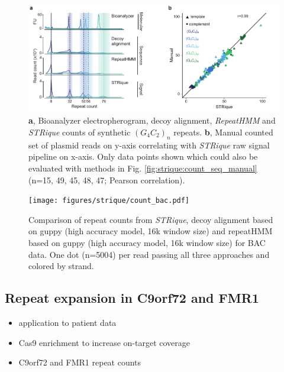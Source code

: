 \begin{figure}[h]
	\centering
	\includegraphics[width=1.0\textwidth]{figures/strique/count_signal_corr.pdf}
	\captionsetup{format=plain}
	\caption[Correlation and strand bias in STR analysis methods]{\textbf{a}, Bioanalyzer electropherogram, decoy alignment, \textit{RepeatHMM} and \textit{STRique} counts of synthetic $ (G_{4}C_{2})_{n} $ repeats. \textbf{b}, Manual counted set of plasmid reads on y-axis correlating with \textit{STRique} raw signal pipeline on x-axis. Only data points shown which could also be evaluated with methods in Fig. \ref{fig:strique:count_seq_manual} (n=15, 49, 45, 48, 47; Pearson correlation).}
	\label{fig:strique:count_signal_corr}
\end{figure}

\begin{figure}[h]
    \centering
    \texttt{[image: figures/strique/count\_bac.pdf]}
    \captionsetup{format=plain}
    \caption[Strand bias in sequence based repeat counts]{Comparison of repeat counts from \textit{STRique}, decoy alignment based on guppy (high accuracy model, 16k window size) and repeatHMM based on guppy (high accuracy model, 16k window size) for BAC data. One dot (n=5004) per read passing all three approaches and colored by strand.}
    \label{fig:strique:count_bac}
\end{figure}


\subsection{Repeat expansion in C9orf72 and FMR1}
\label{subsec:strique:c9orf72}

\begin{itemize}
	\item application to patient data
	\item Cas9 enrichment to increase on-target coverage
	\item C9orf72 and FMR1 repeat counts
\end{itemize}

